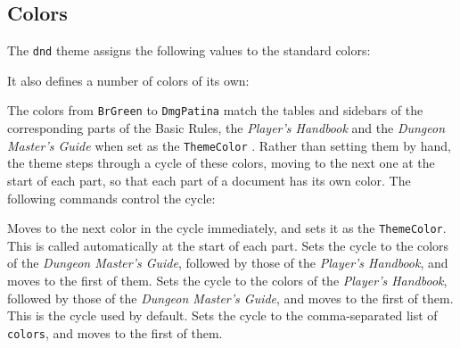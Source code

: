 			\begingroup
			\InsertFontTable{}
			\endgroup

		\subsection{Colors}\label{S:DndColor}

			The \texttt{dnd} theme assigns the following values to the standard colors:

			\noindent\DefaultSwatches{}

			It also defines a number of colors of its own:

			\noindent{}

			The colors from \texttt{BrGreen} to \texttt{DmgPatina} match the tables and sidebars of the corresponding parts of the Basic Rules, the \textit{Player's Handbook} and the \textit{Dungeon Master's Guide} when set as the \texttt{ThemeColor} . Rather than setting them by hand, the theme steps through a cycle of these colors, moving to the next one at the start of each part, so that each part of a document has its own color. The following commands control the cycle:

			{
				Moves to the next color in the cycle immediately, and sets it as the \texttt{ThemeColor}. This is called automatically at the start of each part.
			}
			{
				Sets the cycle to the colors of the \textit{Dungeon Master's Guide}, followed by those of the \textit{Player's Handbook}, and moves to the first of them.
			}
			{
				Sets the cycle to the colors of the \textit{Player's Handbook}, followed by those of the \textit{Dungeon Master's Guide}, and moves to the first of them. This is the cycle used by default.
			}
			{
				Sets the cycle to the comma-separated list of \texttt{colors}, and moves to the first of them.
			}

